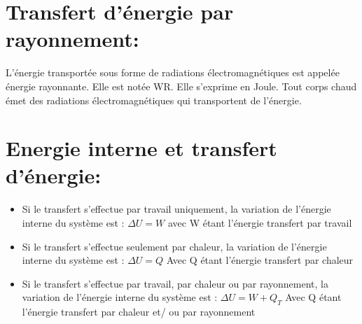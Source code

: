 \documentclass[12pt]{article}
\begin{document}
\section{Transfert d’énergie par rayonnement: }
L'énergie transportée sous forme de radiations
électromagnétiques est appelée énergie rayonnante.
Elle est notée WR. Elle s'exprime en Joule. Tout
corps chaud émet des radiations électromagnétiques
qui transportent de l'énergie.

\section{Energie interne et transfert d’énergie:}
\begin{itemize}
      \item  Si le transfert s'effectue par travail uniquement, la variation de l'énergie interne du
système est : $\Delta{U} = W$ avec W étant l'énergie transfert par travail
\item Si le transfert s'effectue seulement par chaleur, la variation de l'énergie interne du
système est : $\Delta{U} = Q$  Avec Q étant l'énergie transfert par chaleur
\item Si le transfert s'effectue par travail, par chaleur ou par rayonnement, la variation de
l'énergie interne du système est :  $\Delta{U} = W + Q_T$  Avec Q étant l'énergie transfert par chaleur et/ ou par rayonnement

\end{itemize}
\end{document}
